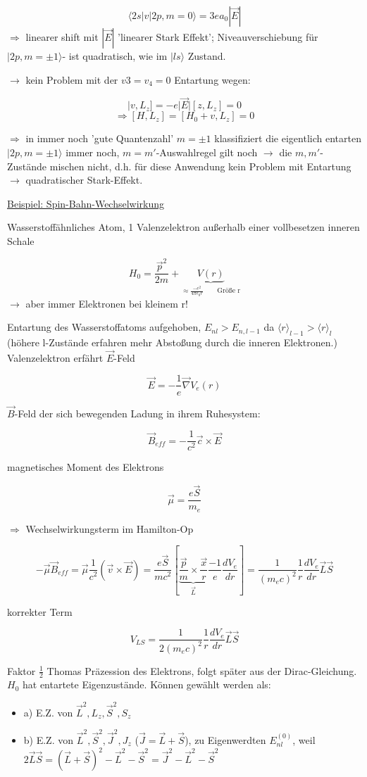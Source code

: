 \[ \langle 2s | v | 2p,m=0\rangle = 3ea_0|\vec E|\]
\(\Rightarrow\) linearer shift mit \(|\vec E|\) 'linearer Stark Effekt'; Niveauverschiebung für \(|2p,m=\pm1\rangle\)- ist quadratisch, wie im \(|ls\rangle\) Zustand.

\(\rightarrow\) kein Problem mit der \(v3=v_4=0\) Entartung wegen:

\[ |v,L_z] = -e|\vec E| [z,L_z] = 0\]
\[\Rightarrow [H,L_z] = [H_0+v,L_z]=0\]

\(\Rightarrow\) in immer noch 'gute Quantenzahl' \(m=\pm 1\) klassifiziert die eigentlich entarten \(|2p,m=\pm 1\rangle\) immer noch, \(m=m'\)-Auswahlregel gilt noch \(\rightarrow\) die \(m,m'\)-Zustände mischen nicht, d.h. für diese Anwendung kein Problem mit Entartung \(\rightarrow\) quadratischer Stark-Effekt.

\underline{Beispiel: Spin-Bahn-Wechselwirkung}

Wasserstoffähnliches Atom, 1 Valenzelektron außerhalb einer vollbesetzen inneren Schale

\[ H_0= \frac{\vec p^2}{2m} + \underbrace{V(r)}_{\approx \frac{-e^2}{4\pi \epsilon_0 r}\qquad\text{Größe r}}\]
\(\rightarrow\) aber immer Elektronen bei kleinem r!

Entartung des Wasserstoffatoms aufgehoben, \(E_{nl}>E_{n,l-1}\) da \(\langle r \rangle_{l-1}> \langle r \rangle_l\) (höhere l-Zustände erfahren mehr Abstoßung durch die inneren Elektronen.) Valenzelektron erfährt \(\vec E\)-Feld

\[ \vec E = -\frac{1}{e}\vec \nabla V_e(r)\]

\(\vec B\)-Feld der sich bewegenden Ladung in ihrem Ruhesystem:

\[ \vec B_{eff} = -\frac{1}{c^2}\vec c\times \vec E\]

magnetisches Moment des Elektrons

\[ \vec\mu = \frac{e \vec S}{m_e}\]

\(\Rightarrow\) Wechselwirkungsterm im Hamilton-Op

\[ -\vec \mu \vec B_{eff} = \vec \mu \frac{1}{c^2}(\vec v \times \vec E) = \frac{e\vec S}{m c^2}\left[\underbrace{ \frac{\vec p}{m}\times \frac{\vec x}{r}}_{\vec L}\frac{-1}{e}\frac{dV_e}{dr} \right]=\frac{1}{(m_ec)^2}\frac{1}{r}\frac{dV_e}{dr}\vec L \vec S\]

korrekter Term

\[ V_{LS}=\frac{1}{2(m_ec)^2}\frac{1}{r}\frac{dV_e}{dr}\vec L \vec S\]

Faktor \(\frac{1}{2}\) Thomas Präzession des Elektrons, folgt später aus der Dirac-Gleichung. \(H_0\) hat entartete Eigenzustände. Können gewählt werden als:
\begin{itemize}
\item a) E.Z. von \(\vec L^2,L_z,\vec S^2,S_z\)
\item b) E.Z. von \(\vec L^2,\vec S^2,\vec J^2,J_z\) (\(\vec J = \vec L + \vec S\)), zu Eigenwerdten \(E^{(0)}_{nl}\), weil \(2\vec L\vec S = (\vec L + \vec S)^2-\vec L^2-\vec S^2 = \vec J^2 - \vec L^2 - \vec S^2\)
\end{itemize}

